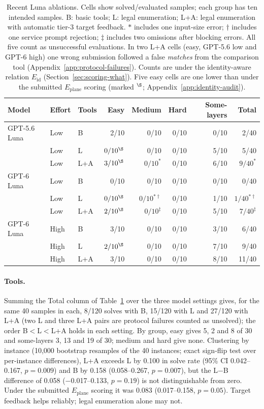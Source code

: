 \begin{table}[htbp]
\centering
\caption{Recent Luna ablations. Cells show solved/evaluated samples; each group
has ten intended samples. B: basic tools; L: legal enumeration; L+A: legal enumeration
with automatic tier-3 target feedback. $*$ includes one input-size error;
$\dagger$ includes one service prompt rejection; $\ddagger$ includes two
omissions after blocking errors. All five count as unsuccessful evaluations. In two L+A cells
(easy, GPT-5.6 low and GPT-6 high) one wrong submission followed a false \emph{matches} from the
comparison tool (Appendix~\ref{app:protocol-failures}). Counts are under the identity-aware
relation $E_{\mathrm{id}}$ (Section~\ref{sec:scoring-what}). Five easy cells are one lower than
under the submitted $E_{\mathrm{plane}}$ scoring (marked $^{\S}$; Appendix~\ref{app:identity-audit}).}
\label{tab:luna-ablations}
\small
\setlength{\tabcolsep}{4pt}
\begin{tabular}{lllrrrrr}
\hline
Model & Effort & Tools & Easy & Medium & Hard & Some-layers & Total \\
\hline
GPT-5.6 Luna & Low & B & 2/10 & 0/10 & 0/10 & 0/10 & 2/40 \\
 & Low & L & $0/10^{\S}$ & 0/10 & 0/10 & 5/10 & 5/40 \\
 & Low & L+A & $3/10^{\S}$ & $0/10^{*}$ & 0/10 & 6/10 & $9/40^{*}$ \\
\hline
GPT-6 Luna & Low & B & 0/10 & 0/10 & 0/10 & 0/10 & 0/40 \\
 & Low & L & $0/10^{\S}$ & $0/10^{*\dagger}$ & 0/10 & 1/10 & $1/40^{*\dagger}$ \\
 & Low & L+A & $2/10^{\S}$ & $0/10^{\ddagger}$ & 0/10 & 5/10 & $7/40^{\ddagger}$ \\
\hline
GPT-6 Luna & High & B & 3/10 & 0/10 & 0/10 & 3/10 & 6/40 \\
 & High & L & $2/10^{\S}$ & 0/10 & 0/10 & 7/10 & 9/40 \\
 & High & L+A & 3/10 & 0/10 & 0/10 & 8/10 & 11/40 \\
\hline
\end{tabular}
\end{table}

\paragraph{Tools.} Summing the Total column of Table~\ref{tab:luna-ablations} over the three model
settings gives, for the same 40 samples in each, 8/120 solves with B, 15/120 with L and 27/120
with L+A (two L and three L+A pairs are protocol failures counted as unsolved); the order B$<$L$<$L+A
holds in each setting. By group, easy gives 5, 2 and 8 of 30 and some-layers 3, 13 and 19 of 30;
medium and hard give none. Clustering by instance (10,000 bootstrap resamples of the 40 instances; exact sign-flip test over
per-instance differences), L+A exceeds L by 0.100 in solve rate (95\% CI 0.042--0.167, $p=0.009$)
and B by 0.158 (0.058--0.267, $p=0.007$), but the L$-$B difference of 0.058 ($-$0.017--0.133,
$p=0.19$) is not distinguishable from zero. Under the submitted $E_{\mathrm{plane}}$ scoring it
was 0.083 (0.017--0.158, $p=0.05$). Target feedback helps reliably; legal enumeration alone may not.

